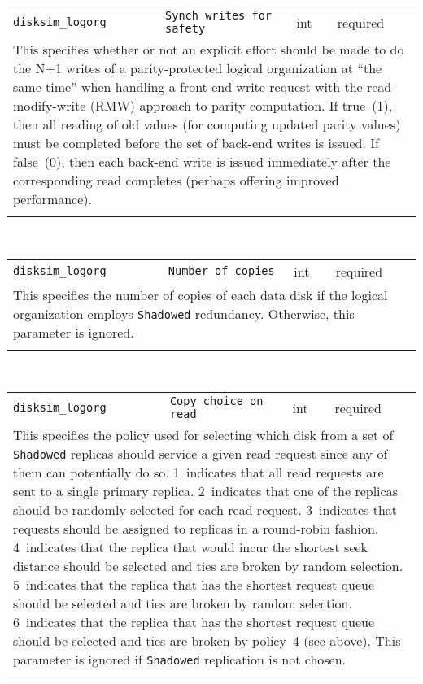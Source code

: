 \noindent 
\begin{tabular}{|p{1.5in}|p{3.5in}|p{0.5in}|p{0.5in}|}
\cline{1-4}
\texttt{disksim\_logorg} & \texttt{Synch writes for safety} & int & required \\ 
\cline{1-4}
\multicolumn{4}{|p{6in}|}{
This specifies whether or not an explicit effort should be made to do the
N+1 writes of a parity-protected logical organization at ``the same
time'' when handling a front-end write request with the
read-modify-write (RMW) approach to parity computation.
If true~(1), then all reading of old values (for computing updated
parity values) must be completed before the set of back-end writes is issued.
If false~(0), then each back-end write is issued immediately after the
corresponding read completes (perhaps offering improved performance).
}\\ 
\cline{1-4}
\multicolumn{4}{p{5in}}{}\\
\end{tabular}\\ 
\noindent 
\begin{tabular}{|p{1.5in}|p{3.5in}|p{0.5in}|p{0.5in}|}
\cline{1-4}
\texttt{disksim\_logorg} & \texttt{Number of copies} & int & required \\ 
\cline{1-4}
\multicolumn{4}{|p{6in}|}{
This specifies the number of copies of each data disk if the logical
organization employs \texttt{Shadowed} redundancy. Otherwise, this
parameter is ignored.
}\\ 
\cline{1-4}
\multicolumn{4}{p{5in}}{}\\
\end{tabular}\\ 
\noindent 
\begin{tabular}{|p{1.5in}|p{3.5in}|p{0.5in}|p{0.5in}|}
\cline{1-4}
\texttt{disksim\_logorg} & \texttt{Copy choice on read} & int & required \\ 
\cline{1-4}
\multicolumn{4}{|p{6in}|}{
This specifies the policy used for selecting which disk from a set of
\texttt{Shadowed} replicas should service a given read request since any
of them can potentially do so.
1~indicates that all read requests are sent to a single primary
replica.
2~indicates that one of the replicas should be randomly selected for
each read request.
3~indicates that requests should be assigned to replicas in a
round-robin fashion.
4~indicates that the replica that would incur the shortest seek
distance should be selected and ties are broken by random selection.
5~indicates that the replica that has the shortest request queue
should be selected and ties are broken by random selection.
6~indicates that the replica that has the shortest request queue
should be selected and ties are broken by policy~4 (see above). This
parameter is ignored if \texttt{Shadowed} replication is not chosen.
}\\ 
\cline{1-4}
\multicolumn{4}{p{5in}}{}\\
\end{tabular}\\ 
